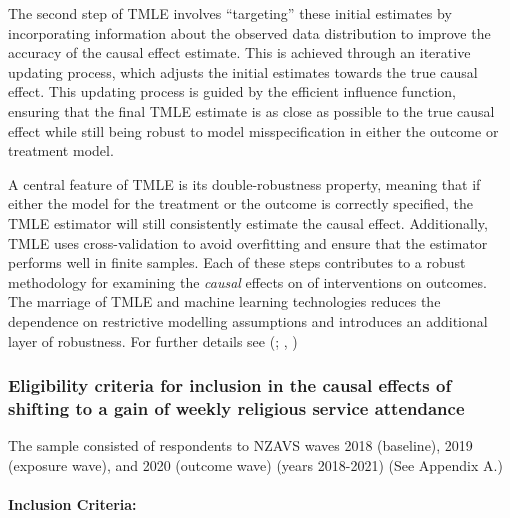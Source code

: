 \documentclass[
  singlecolumn]{article}
\let\oldparagraph\paragraph
\renewcommand{\paragraph}[1]{\oldparagraph{#1}\mbox{}}
\begin{document}
The second step of TMLE involves ``targeting'' these initial estimates
by incorporating information about the observed data distribution to
improve the accuracy of the causal effect estimate. This is achieved
through an iterative updating process, which adjusts the initial
estimates towards the true causal effect. This updating process is
guided by the efficient influence function, ensuring that the final TMLE
estimate is as close as possible to the true causal effect while still
being robust to model misspecification in either the outcome or
treatment model.

A central feature of TMLE is its double-robustness property, meaning
that if either the model for the treatment or the outcome is correctly
specified, the TMLE estimator will still consistently estimate the
causal effect. Additionally, TMLE uses cross-validation to avoid
overfitting and ensure that the estimator performs well in finite
samples. Each of these steps contributes to a robust methodology for
examining the \emph{causal} effects on of interventions on outcomes. The
marriage of TMLE and machine learning technologies reduces the
dependence on restrictive modelling assumptions and introduces an
additional layer of robustness. For further details see
(;
,
)

\subsubsection{Eligibility criteria for inclusion in the causal effects
of shifting to a gain of weekly religious service
attendance}\label{eligibility-criteria-for-inclusion-in-the-causal-effects-of-shifting-to-a-gain-of-weekly-religious-service-attendance}

The sample consisted of respondents to NZAVS waves 2018 (baseline), 2019
(exposure wave), and 2020 (outcome wave) (years 2018-2021) (See Appendix
A.)

\paragraph{Inclusion Criteria:}\label{inclusion-criteria}
\end{document}
